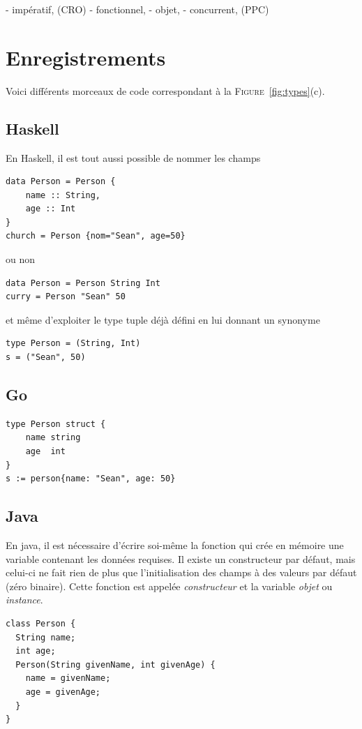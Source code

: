 \documentclass[a4paper,francais]{insalyon}
\begin{document}
- impératif, (CRO)
- fonctionnel, 
- objet, 
- concurrent, (PPC)

\appendix
\section{Enregistrements}
\label{a:enregistrement}

Voici différents morceaux de code correspondant à la \textsc{Figure}~\ref{fig:types}(c).

\subsection{Haskell}

En Haskell, il est tout aussi possible de nommer les champs
\begin{verbatim}
data Person = Person {
    name :: String, 
    age :: Int
}
church = Person {nom="Sean", age=50}
\end{verbatim}
ou non
\begin{verbatim}
data Person = Person String Int
curry = Person "Sean" 50
\end{verbatim}
et même d'exploiter le type tuple déjà défini en lui donnant un synonyme
\begin{verbatim}
type Person = (String, Int)
s = ("Sean", 50)
\end{verbatim}

\subsection{Go}

\begin{verbatim}
type Person struct {
    name string
    age  int
}    
s := person{name: "Sean", age: 50}
\end{verbatim}

\subsection{Java}

En java, il est nécessaire d'écrire soi-même la fonction qui crée en mémoire une variable contenant les données requises. Il existe un constructeur par défaut, mais celui-ci ne fait rien de plus que l'initialisation des champs à des valeurs par défaut (zéro binaire). Cette fonction est appelée \emph{constructeur} et la variable \emph{objet} ou \emph{instance}. 
\begin{verbatim}
class Person {
  String name; 
  int age; 
  Person(String givenName, int givenAge) {
    name = givenName;
    age = givenAge;
  }
}
\end{verbatim}
\end{document}

